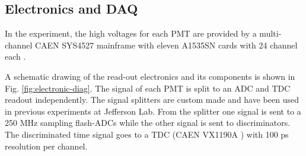 \documentclass[3p,final,twocolumn]{elsarticle}
\begin{document}
\subsection{Electronics and DAQ}
In the experiment, the high voltages for each PMT are provided by a multi-channel CAEN SYS4527 mainframe with eleven A1535SN cards with 24 channel each \cite{caen-hvframe,caen-hvcard}.

A schematic drawing of the read-out electronics and its components is
shown in Fig. \ref{fig:electronic-diag}. The signal of each PMT is
split to an ADC and TDC readout independently.  The signal splitters
are custom made and have been used in previous experiments at
Jefferson Lab.  From the splitter one signal is sent to a 250
\si{\mega\hertz} sampling flash-ADCs \cite{fadc-manual} while the
other signal is sent to discriminators.  The discriminated time signal
goes to a TDC (CAEN VX1190A \cite{caen-tdc}) with 100 ps resolution
per channel.

\end{document}
